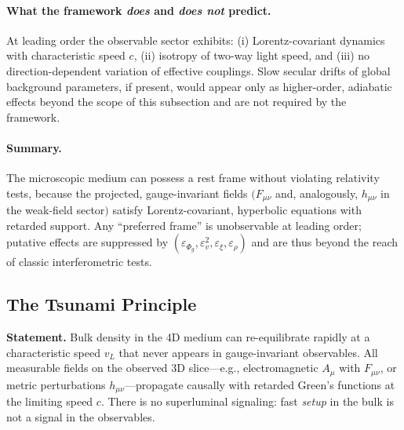 \paragraph{What the framework \emph{does} and \emph{does not} predict.}
At leading order the observable sector exhibits: (i) Lorentz-covariant dynamics with characteristic speed $c$, (ii) isotropy of two-way light speed, and (iii) no direction-dependent variation of effective couplings. Slow secular drifts of global background parameters, if present, would appear only as higher-order, adiabatic effects beyond the scope of this subsection and are not required by the framework.

\paragraph{Summary.}
The microscopic medium can possess a rest frame without violating relativity tests, because the projected, gauge-invariant fields $(F_{\mu\nu}$ and, analogously, $h_{\mu\nu}$ in the weak-field sector$)$ satisfy Lorentz-covariant, hyperbolic equations with retarded support. Any ``preferred frame'' is unobservable at leading order; putative effects are suppressed by $(\varepsilon_{\Phi_g},\varepsilon_v^2,\varepsilon_\xi,\varepsilon_\rho)$ and are thus beyond the reach of classic interferometric tests.

\subsection{The Tsunami Principle}

\textbf{Statement.} Bulk density in the 4D medium can re-equilibrate rapidly at a characteristic speed $v_L$ that never appears in gauge-invariant observables. All measurable fields on the observed 3D slice---e.g., electromagnetic $A_\mu$ with $F_{\mu\nu}$, or metric perturbations $h_{\mu\nu}$---propagate causally with retarded Green's functions at the limiting speed $c$. There is no superluminal signaling: fast \emph{setup} in the bulk is not a signal in the observables.

